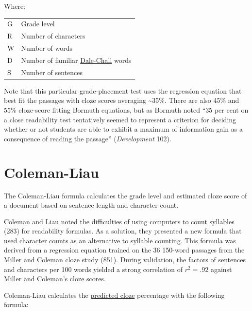 \documentclass[
]{book}
\theoremstyle{definition}
\theoremstyle{definition}
\theoremstyle{definition}
\theoremstyle{definition}
\theoremstyle{remark}
\begin{document}
Where:

\begin{longtable}[]{@{}
  >{\raggedright\arraybackslash}p{}
  >{\raggedright\arraybackslash}p{}@{}}
\toprule
\endhead
G & Grade level \\
R & Number of characters \\
W & Number of words \\
D & Number of familiar \protect\hyperlink{dale-chall-test}{Dale-Chall} words \\
S & Number of sentences \\
\bottomrule
\end{longtable}

Note that this particular grade-placement test uses the regression equation that best fit the passages with cloze scores averaging \textasciitilde35\%. There are also 45\% and 55\% cloze-score fitting Bormuth equations, but as Bormuth noted ``35 per cent on a close readability test tentatively seemed to represent a criterion for deciding whether or not students are able to exhibit a maximum of information gain as a consequence of reading the passage'' (\emph{Development} 102).

\newpage

\hypertarget{coleman-liau-test}{%
\section{\texorpdfstring{Coleman-Liau}{Coleman-Liau}}\label{coleman-liau-test}}

The Coleman-Liau formula calculates the grade level and estimated cloze score of a document based on sentence length and character count.

Coleman and Liau noted the difficulties of using computers to count syllables (283) for readability formulas. As a solution, they presented a new formula that used character counts as an alternative to syllable counting. This formula was derived from a regression equation trained on the 36 150-word passages from the Miller and Coleman cloze study (851). During validation, the factors of sentences and characters per 100 words yielded a strong correlation of \(r^2 = .92\) against Miller and Coleman's cloze scores.

Coleman-Liau calculates the \protect\hyperlink{cloze}{predicted cloze} percentage with the following formula:
\end{document}
